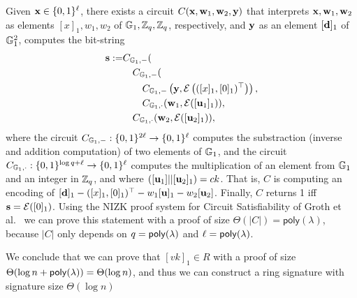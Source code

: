 Given \(\mathbf{x}\in\{0,1\}^\ell\), there exists a circuit \(C(\mathbf{x},\mathbf{w}_1,\mathbf{w}_2,\mathbf{y})\) that interprets \(\mathbf{x},\mathbf{w}_1,\mathbf{w}_2\) as  elements \([x]_1,w_1,w_2\) of \(\mathbb{G}_1,\mathbb{Z}_q,\mathbb{Z}_q\), respectively, and \(\mathbf{y}\) as an element \([\mathbf{d}]_1\) of \(\mathbb{G}_1^2\), computes the bit-string
\begin{align*}
\mathbf{s}:=
    &C_{\mathbb{G}_1,-}(\\
        &\quad C_{\mathbb{G}_1,-}(\\
            &\qquad C_{\mathbb{G}_1,-}\left(
                \mathbf{y},
                \mathcal{E}\left(
                        ({[x]_1},{[0]_1})^\top\right)\right),\\
            &\qquad C_{\mathbb{G}_1,\cdot}(
                        \mathbf{w}_1,
                        \mathcal{E}([\mathbf{u}_1]_1)),\\
        &\quad C_{\mathbb{G}_1,\cdot}(
                    \mathbf{w}_2,
                    \mathcal{E}([\mathbf{u}_2]_1)),
\end{align*}
where the circuit $C_{\mathbb{G}_1,-}:\{0,1\}^{2\ell}\to\{0,1\}^\ell$ computes the substraction (inverse and addition computation) of two elements of $\mathbb{G}_1$, and the circuit $C_{\mathbb{G}_1,\cdot}:\{0,1\}^{\log q+\ell}\to\{0,1\}^\ell$ computes the multiplication of an element from $\mathbb{G}_1$ and an integer in $\mathbb{Z}_q$, and where \(([\mathbf{u}_1]||[\mathbf{u}_2]_1)=ck\). That is, $C$ is computing an encoding of $[\mathbf{d}]_1-([x]_1,[0]_1)^\top-w_1[\mathbf{u}]_1-w_2[\mathbf{u}_2]$. Finally, $C$ returns 1 iff \(\mathbf{s}=\mathcal{E}([0]_1)\). Using the NIZK proof system for Circuit Satisfiability of Groth et al.~\cite{EC:GroOstSah06} we can prove this statement with a proof of size \(\Theta(|C|)=\mathsf{poly}(\lambda)\), because \(|C|\) only depends on \(q=\mathsf{poly}(\lambda)\) and \(\ell=\mathsf{poly}(\lambda)\).

We conclude that we can prove that \([vk]_1\in R\) with a proof of size \(\Theta(\log n +\mathsf{poly}(\lambda))=\Theta(\log n)\), and thus we can construct a ring signature with signature size \(\Theta(\log n)\)

